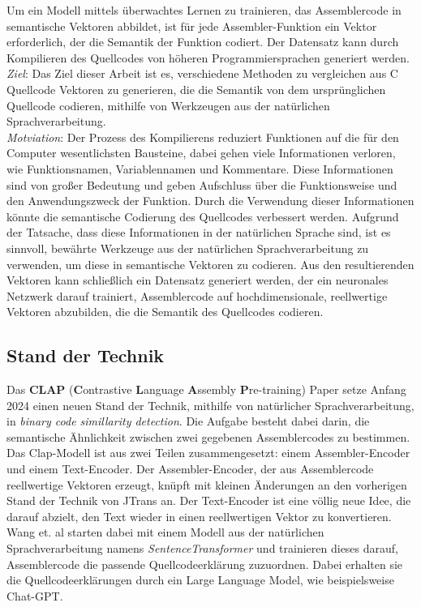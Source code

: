 \documentclass[12pt,letterpaper,ngerman]{article}
\begin{document}
Um ein Modell mittels überwachtes Lernen zu trainieren, das Assemblercode in 
semantische Vektoren abbildet, ist für jede Assembler-Funktion ein Vektor 
erforderlich, der die Semantik der Funktion codiert. Der Datensatz kann durch 
Kompilieren des Quellcodes von höheren Programmiersprachen generiert 
werden.\\

\textit{Ziel}: Das Ziel dieser Arbeit ist es, verschiedene Methoden zu vergleichen
aus C Quellcode Vektoren zu generieren, die die Semantik von dem ursprünglichen
Quellcode codieren, mithilfe von Werkzeugen aus der natürlichen Sprachverarbeitung.\\

\textit{Motviation}: Der Prozess des Kompilierens reduziert Funktionen
auf die für den Computer wesentlichsten Bausteine, dabei gehen viele 
Informationen verloren, wie Funktionsnamen, Variablennamen und Kommentare. 
Diese Informationen sind von großer Bedeutung und geben Aufschluss über 
die Funktionsweise und den Anwendungszweck der Funktion. Durch die Verwendung 
dieser Informationen könnte die semantische Codierung des Quellcodes verbessert
werden. Aufgrund der Tatsache, dass diese Informationen in der natürlichen 
Sprache sind, ist es sinnvoll, bewährte Werkzeuge aus der natürlichen 
Sprachverarbeitung zu verwenden, um diese in semantische Vektoren zu codieren. 
Aus den resultierenden Vektoren kann schließlich ein Datensatz generiert werden,
der ein neuronales Netzwerk darauf trainiert, Assemblercode auf hochdimensionale,
reellwertige Vektoren abzubilden, die die Semantik des Quellcodes codieren.
\pagebreak
\subsection{Stand der Technik}
Das {\bf CLAP} ({\bf C}ontrastive {\bf L}anguage {\bf A}ssembly {\bf P}re-training) 
Paper \cite{wang2024claplearningtransferablebinary} 
setze Anfang 2024 einen neuen Stand der Technik, mithilfe von natürlicher
Sprachverarbeitung, in \textit{binary code simillarity detection}. Die Aufgabe 
besteht dabei darin, die semantische Ähnlichkeit zwischen zwei gegebenen 
Assemblercodes zu bestimmen.\\

Das Clap-Modell ist aus zwei Teilen zusammengesetzt: einem Assembler-Encoder 
und einem Text-Encoder. Der Assembler-Encoder, der aus Assemblercode 
reellwertige Vektoren erzeugt, knüpft mit kleinen Änderungen an den vorherigen
Stand der Technik von JTrans an. Der Text-Encoder ist eine völlig neue Idee, 
die darauf abzielt, den Text wieder in einen reellwertigen Vektor zu 
konvertieren. Wang et. al starten dabei mit einem Modell aus der natürlichen 
Sprachverarbeitung namens \textit{SentenceTransformer} und trainieren dieses
darauf, Assemblercode die passende Quellcodeerklärung  zuzuordnen. Dabei 
erhalten sie die Quellcodeerklärungen durch ein Large  Language Model, wie
beispielsweise Chat-GPT.\\
\end{document}
